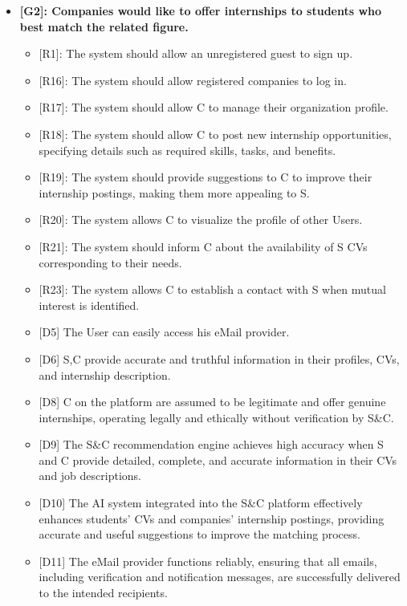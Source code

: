 \begin{itemize}
\item
  \textbf{{[}G2{]}: Companies would like to offer internships to
  students who best match the related figure.}

  \begin{itemize}
  \item
    {[}R1{]}: The system should allow an unregistered guest to sign up.
  \item
    {[}R16{]}: The system should allow registered companies to log in.
  \item
    {[}R17{]}: The system should allow C to manage their organization
    profile.
  \item
    {[}R18{]}: The system should allow C to post new internship
    opportunities, specifying details such as required skills, tasks,
    and benefits.
  \item
    {[}R19{]}: The system should provide suggestions to C to improve
    their internship postings, making them more appealing to S.
  \item
    {[}R20{]}: The system allows C to visualize the profile of other
    Users.
  \item
    {[}R21{]}: The system should inform C about the availability of S
    CVs corresponding to their needs.
  \item
    {[}R23{]}: The system allows C to establish a contact with S when
    mutual interest is identified.
  \item
    {[}D5{]} The User can easily access his eMail provider.
  \item
    {[}D6{]} S,C provide accurate and truthful information in their
    profiles, CVs, and internship description.
  \item
    {[}D8{]} C on the platform are assumed to be legitimate and offer
    genuine internships, operating legally and ethically without
    verification by S\&C.
  \item
    {[}D9{]} The S\&C recommendation engine achieves high accuracy when
    S and C provide detailed, complete, and accurate information in
    their CVs and job descriptions.
  \item
    {[}D10{]} The AI system integrated into the S\&C platform
    effectively enhances students' CVs and
    companies' internship postings, providing accurate
    and useful suggestions to improve the matching process.
  \item
    {[}D11{]} The eMail provider functions reliably, ensuring that all
    emails, including verification and notification messages, are
    successfully delivered to the intended recipients.
  \end{itemize}
\end{itemize}

